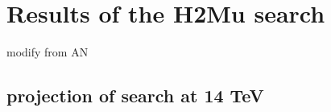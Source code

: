 \chapter{Results of the H2Mu search} \label{chp:hmm_results}

modify from AN

\section{projection of search at 14 TeV}